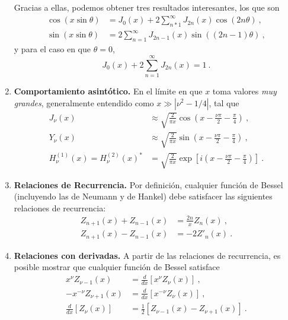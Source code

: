 \begin{propiedad}
\begin{enumerate}
        Gracias a ellas, podemos obtener tres resultados interesantes, los que son 
        \begin{align}
            \cos(x \sin \theta) & = J_0(x) + 2 \sum_{n*1}^\infty J_{2n}(x) \cos(2n\theta) \ , \\
            \sin(x \sin \theta) & = 2 \sum_{n=1}^\infty J_{2n-1}(x) \sin((2n-1)\theta) \ ,
        \end{align}
        y para el caso en que $\theta = 0$, 
        \begin{equation}
            J_0(x) + 2\sum_{n=1}^\infty J_{2n}(x) = 1 \ .
        \end{equation}
        \item \textbf{Comportamiento asintótico.} En el límite en que $x$ toma valores \emph{muy grandes}, generalmente entendido como $x \gg |\nu^2 - 1/4|$, tal que
        \begin{align}
            J_\nu(x) & \approx \sqrt{\frac{2}{\pi x}} \cos\left( x - \frac{\nu \pi}{2} - \frac{\pi}{4} \right) \ , \\
            Y_\nu(x) & \approx \sqrt{\frac{2}{\pi x}} \sin\left( x - \frac{\nu \pi}{2} - \frac{\pi}{4} \right) \ , \\
            H^{(1)}_\nu(x) = H^{(2)}_\nu(x)^\ast & = \sqrt{\frac{2}{\pi x}} \exp\left[ i \left( x - \frac{\nu \pi}{2} - \frac{\pi}{4} \right) \right] \ .
        \end{align}
        \item \textbf{Relaciones de Recurrencia.} Por definición, cualquier función de Bessel (incluyendo las de Neumann y de Hankel) debe satisfacer las siguientes relaciones de recurrencia:
        \begin{align}
            Z_{n+1}(x) + Z_{n-1}(x) & = \frac{2n}{x} Z_n(x) \ , \\
            Z_{n+1}(x) - Z_{n-1}(x) & = -2 Z'_n(x) \ . 
        \end{align}

        \item \textbf{Relaciones con derivadas.} A partir de las relaciones de recurrencia, es posible mostrar que cualquier función de Bessel satisface
        \begin{align}
            x^\nu Z_{\nu-1}(x) & = \frac{d}{dx}\left[ x^\nu Z_\nu(x) \right] \ , \\
            -x^{-\nu} Z_{\nu+1}(x) & = \frac{d}{dx}\left[ x^{-\nu} Z_\nu(x) \right] \ , \\
            \frac{d}{dx} \left[ Z_\nu(x) \right] & = \frac{1}{2} \left[ Z_{\nu-1}(x) - Z_{\nu+1}(x) \right] \ .
        \end{align}
    \end{enumerate}
\end{propiedad}


